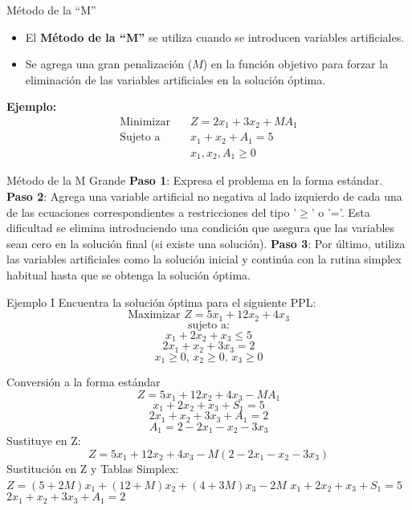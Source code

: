 \documentclass{beamer}
\begin{document}
\begin{frame}{Método de la ``M''}
    \begin{itemize}
        \item El \textbf{Método de la ``M''} se utiliza cuando se introducen variables artificiales.
        \item Se agrega una gran penalización (\( M \)) en la función objetivo para forzar la eliminación de las variables artificiales en la solución óptima.
    \end{itemize}
    \pause
    \textbf{Ejemplo:}
    \begin{align*}
        \text{Minimizar} & \quad Z = 2x_1 + 3x_2 + MA_1 \\
        \text{Sujeto a} & \quad x_1 + x_2 + A_1 = 5 \\
        & \quad x_1, x_2, A_1 \geq 0
    \end{align*}
\end{frame}

\begin{frame}{Método de la M Grande}
    \textbf{Paso 1}: Expresa el problema en la forma estándar.
    \newline
    \textbf{Paso 2}: Agrega una variable artificial no negativa al lado izquierdo de cada una de las ecuaciones correspondientes a restricciones del tipo '$\ge$' o '='.
    \newline
    Esta dificultad se elimina introduciendo una condición que asegura que las variables sean cero en la solución final (si existe una solución).
    \newline
    \textbf{Paso 3}: Por último, utiliza las variables artificiales como la solución inicial y continúa con la rutina simplex habitual hasta que se obtenga la solución óptima.
\end{frame}

\begin{frame}{Ejemplo I}
    Encuentra la solución óptima para el siguiente PPL:
    \[
    \text{Maximizar } Z = 5x_1 + 12x_2 + 4x_3
    \]
    \[
    \text{sujeto a:}
    \]
    \[
    x_1 + 2x_2 + x_3 \leq 5
    \]
    \[
    2x_1 + x_2 + 3x_3 = 2
    \]
    \[
    x_1 \geq 0, \, x_2 \geq 0, \, x_3 \geq 0
    \]
\end{frame}

\begin{frame}
Conversión a la forma estándar
    \[
    Z = 5x_1 + 12x_2 + 4x_3 - M A_1
    \]
    \[
    x_1 + 2x_2 + x_3 + S_1 = 5
    \]
    \[
    2x_1 + x_2 + 3x_3 + A_1 = 2
    \]
    \[
    A_1 = 2 - 2x_1 - x_2 - 3x_3
    \]
    Sustituye en Z:
    \[
    Z = 5x_1 + 12x_2 + 4x_3 - M(2 - 2x_1 - x_2 - 3x_3)
    \]
    Sustitución en Z y Tablas Simplex:
    \(
    Z = (5 + 2M)x_1 + (12 + M)x_2 + (4 + 3M)x_3 - 2M
    \)
    \newline
    \(
    x_1 + 2x_2 + x_3 + S_1 = 5
    \)
    \newline
    \(
    2x_1 + x_2 + 3x_3 + A_1 = 2
    \)
\end{frame}
\end{document}
